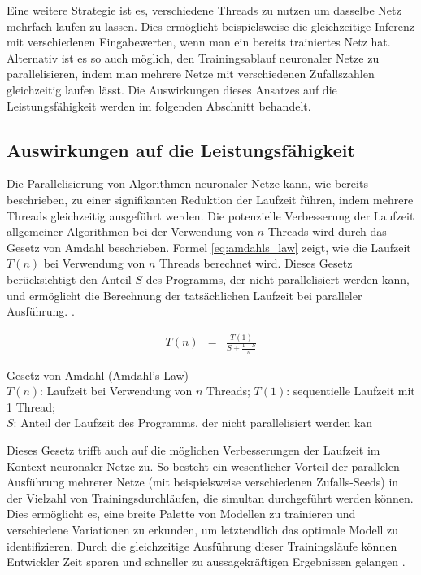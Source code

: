 Eine weitere Strategie ist es, verschiedene Threads zu nutzen um dasselbe Netz mehrfach laufen zu lassen. Dies ermöglicht beispielsweise die gleichzeitige Inferenz mit verschiedenen Eingabewerten, wenn man ein bereits trainiertes Netz hat. Alternativ ist es so auch möglich, den Trainingsablauf neuronaler Netze zu parallelisieren, indem man mehrere Netze mit verschiedenen Zufallszahlen gleichzeitig laufen lässt. Die Auswirkungen dieses Ansatzes auf die Leistungsfähigkeit werden im folgenden Abschnitt behandelt.

\subsection{Auswirkungen auf die Leistungsfähigkeit}
\label{sec:Grundlagen_Parallelisierung_Leistungsfähigkeit}

Die Parallelisierung von Algorithmen neuronaler Netze kann, wie bereits beschrieben, zu einer signifikanten Reduktion der Laufzeit führen, indem mehrere Threads gleichzeitig ausgeführt werden. Die potenzielle Verbesserung der Laufzeit allgemeiner Algorithmen bei der Verwendung von $n$ Threads wird durch das Gesetz von Amdahl beschrieben. Formel \ref{eq:amdahls_law} zeigt, wie die Laufzeit $T(n)$ bei Verwendung von $n$ Threads berechnet wird. Dieses Gesetz berücksichtigt den Anteil $S$ des Programms, der nicht parallelisiert werden kann, und ermöglicht die Berechnung der tatsächlichen Laufzeit bei paralleler Ausführung. \citep{amdahl_validity_single_processor}.

\begin{eqnarray}
    T(n) &=& \frac{T(1)}{S + \frac{1 - S}{n}} \label{eq:amdahls_law}
\end{eqnarray}

\begin{center}
    \begin{footnotesize}
        Gesetz von Amdahl (Amdahl's Law) \\
        $T(n)$: Laufzeit bei Verwendung von $n$ Threads; $T(1)$: sequentielle Laufzeit mit 1 Thread;\\$S$: Anteil der Laufzeit des Programms, der nicht parallelisiert werden kan
    \end{footnotesize}
\end{center}

Dieses Gesetz trifft auch auf die möglichen Verbesserungen der Laufzeit im Kontext neuronaler Netze zu. So besteht ein wesentlicher Vorteil der parallelen Ausführung mehrerer Netze (mit beispielsweise verschiedenen Zufalls-Seeds) in der Vielzahl von Trainingsdurchläufen, die simultan durchgeführt werden können. Dies ermöglicht es, eine breite Palette von Modellen zu trainieren und verschiedene Variationen zu erkunden, um letztendlich das optimale Modell zu identifizieren. Durch die gleichzeitige Ausführung dieser Trainingsläufe können Entwickler Zeit sparen und schneller zu aussagekräftigen Ergebnissen gelangen \citep{Practical_neural_network_recipes_C++}.

